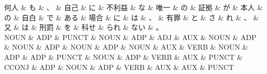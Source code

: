 \documentclass[tikz,border=5pt]{standalone}
\begin{document}
\small
\begin{dependency}[edge unit distance=11.4pt]
    \begin{deptext}[column sep=0.5em]
        何人 \& も \& 、 \& 自己 \& に \& 不利益 \& な \& 唯一 \& の \& 証拠 \& が \& 本人 \& の \& 自白 \& で \& ある \& 場合 \& に \& は \& 、 \& 有罪 \& と \& さ \& れ \& 、 \& 又 \& は \& 刑罰 \& を \& 科せ \& られ \& ない \& 。\\
        NOUN \& ADP \& PUNCT \& NOUN \& ADP \& ADJ \& AUX \& NOUN \& ADP \& NOUN \& ADP \& NOUN \& ADP \& NOUN \& AUX \& VERB \& NOUN \& ADP \& ADP \& PUNCT \& NOUN \& ADP \& VERB \& AUX \& PUNCT \& CCONJ \& ADP \& NOUN \& ADP \& VERB \& AUX \& AUX \& PUNCT\\
    \end{deptext}
\end{dependency}
\end{document}
